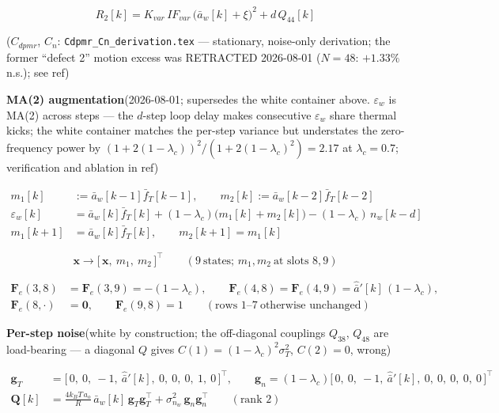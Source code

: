 \documentclass[11pt,a4paper,fontset=none]{ctexart}
\begin{document}
\begin{equation*}
R_2[k] = K_{var}\,IF_{var}\,\bigl(\bar{a}_w[k]+\xi\bigr)^{2}
  + d\,Q_{44}[k]
\end{equation*}

($C_{dpmr}$, $C_n$: \texttt{Cdpmr\_Cn\_derivation.tex} --- stationary,
noise-only derivation; the former ``defect 2'' motion excess was RETRACTED
2026-08-01 ($N{=}48$: $+1.33\%$ n.s.); see ref)

\textbf{MA(2) augmentation}\quad (2026-08-01; supersedes the white
container above.  $\varepsilon_w$ is MA(2) across steps --- the $d$-step
loop delay makes consecutive $\varepsilon_w$ share thermal kicks; the
white container matches the per-step variance but understates the
zero-frequency power by $(1+2(1{-}\lambda_c))^2/(1+2(1{-}\lambda_c)^2)
= 2.17$ at $\lambda_c = 0.7$; verification and ablation in ref)

\begin{align*}
m_1[k] &:= \bar{a}_w[k-1]\bar{f}_T[k-1], \qquad
m_2[k] := \bar{a}_w[k-2]\bar{f}_T[k-2] \\
\varepsilon_w[k] &= \bar{a}_w[k]\bar{f}_T[k]
  + (1-\lambda_c)\bigl(m_1[k] + m_2[k]\bigr)
  - (1-\lambda_c)\,n_w[k-d] \\
m_1[k+1] &= \bar{a}_w[k]\bar{f}_T[k], \qquad
m_2[k+1] = m_1[k]
\end{align*}

\begin{equation*}
\mathbf{x} \to
\bigl[\,\mathbf{x},\ m_1,\ m_2\,\bigr]^{\top}
\qquad (9\ \text{states; } m_1, m_2\ \text{at slots } 8, 9)
\end{equation*}

\begin{align*}
\mathbf{F}_e(3,8) &= \mathbf{F}_e(3,9) = -(1-\lambda_c), \qquad
\mathbf{F}_e(4,8) = \mathbf{F}_e(4,9) = \hat{\bar{a}}'[k]\,(1-\lambda_c), \\
\mathbf{F}_e(8,\cdot) &= \mathbf{0}, \qquad
\mathbf{F}_e(9,8) = 1
\qquad (\text{rows } 1\text{--}7\ \text{otherwise unchanged})
\end{align*}

\textbf{Per-step noise}\quad (white by construction; the off-diagonal
couplings $Q_{38}$, $Q_{48}$ are load-bearing --- a diagonal $Q$ gives
$C(1) = (1-\lambda_c)^2\sigma^2_T$, $C(2) = 0$, wrong)

\begin{align*}
\mathbf{g}_T &= \bigl[\,0,\ 0,\ -1,\ \hat{\bar{a}}'[k],\ 0,\ 0,\ 0,\
  1,\ 0\,\bigr]^{\top}, \qquad
\mathbf{g}_n = (1-\lambda_c)\bigl[\,0,\ 0,\ -1,\ \hat{\bar{a}}'[k],\
  0,\ 0,\ 0,\ 0,\ 0\,\bigr]^{\top} \\
\mathbf{Q}[k] &= \frac{4k_BT\,a_o}{R}\,\bar{a}_w[k]\,
  \mathbf{g}_T\mathbf{g}_T^{\top}
  + \sigma^2_{n_w}\,\mathbf{g}_n\mathbf{g}_n^{\top}
\qquad (\text{rank } 2)
\end{align*}
\end{document}
